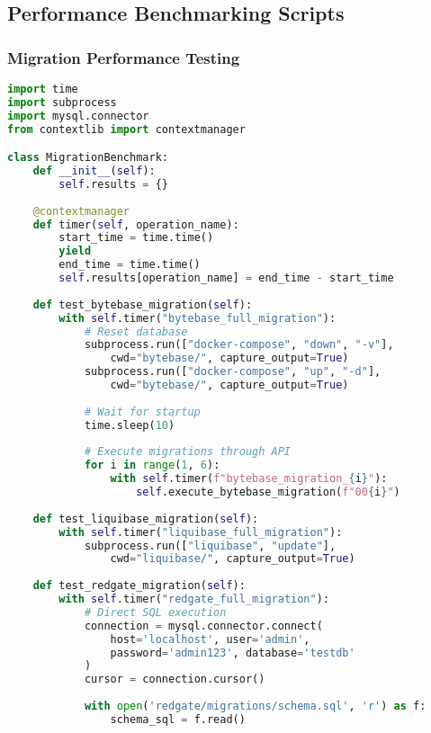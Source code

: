 \subsection{Performance Benchmarking Scripts}

\subsubsection{Migration Performance Testing}
\begin{lstlisting}[language=Python, caption=Performance Benchmark Script]
import time
import subprocess
import mysql.connector
from contextlib import contextmanager

class MigrationBenchmark:
    def __init__(self):
        self.results = {}
    
    @contextmanager
    def timer(self, operation_name):
        start_time = time.time()
        yield
        end_time = time.time()
        self.results[operation_name] = end_time - start_time
    
    def test_bytebase_migration(self):
        with self.timer("bytebase_full_migration"):
            # Reset database
            subprocess.run(["docker-compose", "down", "-v"], 
                cwd="bytebase/", capture_output=True)
            subprocess.run(["docker-compose", "up", "-d"], 
                cwd="bytebase/", capture_output=True)
            
            # Wait for startup
            time.sleep(10)
            
            # Execute migrations through API
            for i in range(1, 6):
                with self.timer(f"bytebase_migration_{i}"):
                    self.execute_bytebase_migration(f"00{i}")
    
    def test_liquibase_migration(self):
        with self.timer("liquibase_full_migration"):
            subprocess.run(["liquibase", "update"], 
                cwd="liquibase/", capture_output=True)
    
    def test_redgate_migration(self):
        with self.timer("redgate_full_migration"):
            # Direct SQL execution
            connection = mysql.connector.connect(
                host='localhost', user='admin', 
                password='admin123', database='testdb'
            )
            cursor = connection.cursor()
            
            with open('redgate/migrations/schema.sql', 'r') as f:
                schema_sql = f.read()
            

\end{lstlisting}

